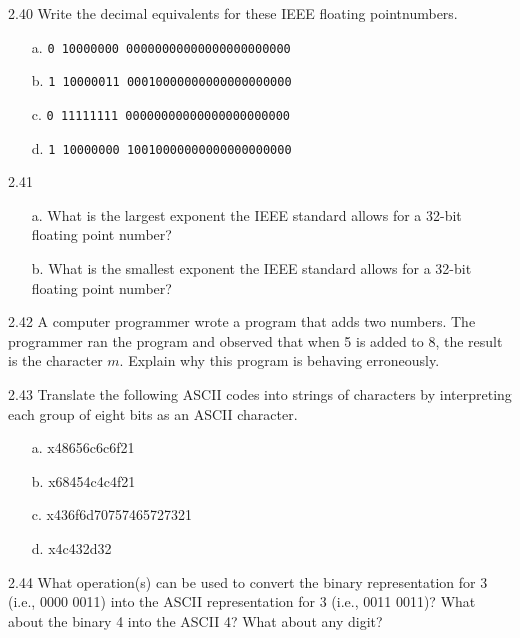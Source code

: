 \documentclass{patt}
\begin{document}
\begin{exercises}
\smallskip

\item[2.40] Write the decimal equivalents for these IEEE floating point\break numbers.
\begin{enumerate}[d.]
\item[a.] {\tt 0 10000000 00000000000000000000000}
\item[b.] {\tt 1 10000011 00010000000000000000000}
\item[c.] {\tt 0 11111111 00000000000000000000000}
\item[d.] {\tt 1 10000000 10010000000000000000000}
\end{enumerate}

\smallskip

\item[2.41]
\begin{enumerate}
\item[a.] What is the largest exponent the IEEE standard allows for
a 32-bit floating point number?
\item[b.] What is the smallest exponent the IEEE standard allows for
a 32-bit floating point number?
\end{enumerate}

\smallskip

\item[2.42] A computer programmer wrote a program that adds
two numbers. The programmer ran the program and observed that
when 5 is added to 8,\break
the result is the character $m$.
Explain why this program is behaving erroneously.

\smallskip

\item[2.43] Translate the following ASCII codes into strings of characters by
interpreting each group of eight bits as an ASCII character.
\begin{enumerate}[d.]
\item[a.] x48656c6c6f21
\item[b.] x68454c4c4f21
\item[c.] x436f6d70757465727321
\item[d.] x4c432d32
\end{enumerate}

\pagebreak

\item[2.44] What operation(s) can be used to convert the binary representation
for 3 (i.e., 0000 0011) into the ASCII representation for 3 (i.e.,
0011 0011)? What about the binary 4 into the ASCII 4? What about any
digit?


\end{exercises}
\end{document}
